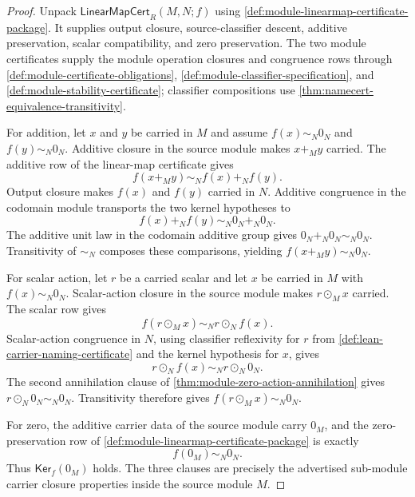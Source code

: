 \begin{proof}
Unpack $\mathsf{LinearMapCert}_R(M,N;f)$ using \autoref{def:module-linearmap-certificate-package}. It supplies output closure, source-classifier descent, additive preservation, scalar compatibility, and zero preservation. The two module certificates supply the module operation closures and congruence rows through \autoref{def:module-certificate-obligations}, \autoref{def:module-classifier-specification}, and \autoref{def:module-stability-certificate}; classifier compositions use \autoref{thm:namecert-equivalence-transitivity}.

For addition, let $x$ and $y$ be carried in $M$ and assume $f(x)\sim_N0_N$ and $f(y)\sim_N0_N$. Additive closure in the source module makes $x+_M y$ carried. The additive row of the linear-map certificate gives
$$
f(x+_M y)\sim_N f(x)+_N f(y).
$$
Output closure makes $f(x)$ and $f(y)$ carried in $N$. Additive congruence in the codomain module transports the two kernel hypotheses to
$$
f(x)+_N f(y)\sim_N0_N+_N0_N.
$$
The additive unit law in the codomain additive group gives $0_N+_N0_N\sim_N0_N$. Transitivity of $\sim_N$ composes these comparisons, yielding $f(x+_M y)\sim_N0_N$.

For scalar action, let $r$ be a carried scalar and let $x$ be carried in $M$ with $f(x)\sim_N0_N$. Scalar-action closure in the source module makes $r\odot_M x$ carried. The scalar row gives
$$
f(r\odot_M x)\sim_N r\odot_N f(x).
$$
Scalar-action congruence in $N$, using classifier reflexivity for $r$ from \autoref{def:lean-carrier-naming-certificate} and the kernel hypothesis for $x$, gives
$$
r\odot_N f(x)\sim_N r\odot_N0_N.
$$
The second annihilation clause of \autoref{thm:module-zero-action-annihilation} gives $r\odot_N0_N\sim_N0_N$. Transitivity therefore gives $f(r\odot_M x)\sim_N0_N$.

For zero, the additive carrier data of the source module carry $0_M$, and the zero-preservation row of \autoref{def:module-linearmap-certificate-package} is exactly
$$
f(0_M)\sim_N0_N.
$$
Thus $\mathsf{Ker}_f(0_M)$ holds. The three clauses are precisely the advertised sub-module carrier closure properties inside the source module $M$.
\end{proof}

